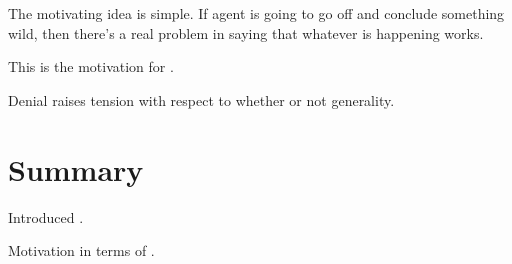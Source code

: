 \begin{note}
  The motivating idea is simple.
  If agent is going to go off and conclude something wild, then there's a real problem in saying that whatever is happening works.
\end{note}

\begin{note}
  This is the motivation for .

  Denial raises tension with respect to whether or not generality.
\end{note}

\section{Summary}
\label{sec:summary-1}

\begin{note}
  Introduced .

  Motivation in terms of \tC{}.
\end{note}











